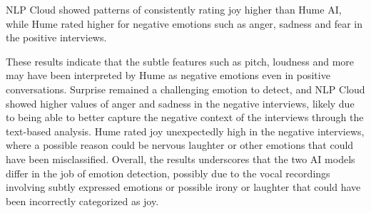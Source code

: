 NLP Cloud showed patterns of consistently rating joy higher than Hume AI, while Hume rated higher for negative emotions such as anger, sadness and fear in the positive interviews.

These results indicate that the subtle features such as pitch, loudness and more may have been interpreted by Hume as negative emotions even in positive conversations.
Surprise remained a challenging emotion to detect, and NLP Cloud showed higher values of anger and sadness in the negative interviews, likely due to being able to better capture the negative context of the interviews through the text-based analysis.
Hume rated joy unexpectedly high in the negative interviews, where a possible reason could be nervous laughter or other emotions that could have been misclassified.
Overall, the results underscores that the two AI models differ in the job of emotion detection, possibly due to the vocal recordings involving subtly expressed emotions or possible irony or laughter that could have been incorrectly categorized as joy. 
